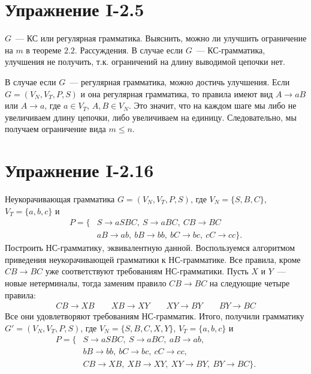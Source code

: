 \documentclass[12pt, oneside]{memoir}
\begin{document}
\section*{Упражнение I-2.5}
\begin{solution}
    {$G$~--- КС или регулярная грамматика.}
    {Выяснить, можно ли улучшить ограничение на $m$ в теореме $2.2$.}
    {Рассуждения.}
    В случае если $G$~--- КС-грамматика, улучшения не получить, т.к. ограничений на длину выводимой цепочки нет.

    В случае если $G$~--- регулярная грамматика, можно достичь улучшения.
    Если $G = (V_N, V_T, P, S)$ и она регулярная грамматика, то правила имеют вид $A \to aB$ или $A \to a$, где $a \in V_T$, $A,B \in V_N$.
    Это значит, что на каждом шаге мы либо не увеличиваем длину цепочки, либо увеличиваем на единицу.
    Следовательно, мы получаем ограничение вида $m \le n$.
\end{solution}

\section*{Упражнение I-2.16}
\begin{solution}
    {Неукорачивающая грамматика $G = (V_N, V_T, P, S)$, где $V_N = \{S, B, C\}$, $V_T = \{a,b,c\}$ и
        \begin{align*}
            P = \{ & S \to aSBC,\ S \to aBC,\ CB \to BC               \\
                   & aB \to ab,\ bB \to bb,\ bC \to bc,\ cC \to cc\}.
        \end{align*}}
    {Построить НС-грамматику, эквивалентную данной.}
    {Воспользуемся алгоритмом приведения неукорачивающей грамматики к НС-грамматике.}
    Все правила, кроме $CB \to BC$ уже соответствуют требованиям НС-грамматики.
    Пусть $X$ и $Y$~--- новые нетерминалы, тогда заменим правило $CB \to BC$ на следующие четыре правила:
    \begin{gather*}
        CB \to XB \qquad XB \to XY \qquad XY \to BY \qquad BY \to BC
    \end{gather*}
    Все они удовлетворяют требованиям НС-грамматик.
    Итого, получили грамматику $G' = (V_N, V_T, P, S)$, где $V_N = \{S, B, C, X, Y\}$, $V_T = \{a,b,c\}$ и
    \begin{align*}
        P = \{ & S \to aSBC,\ S \to aBC,\ aB \to ab,                \\
               & bB \to bb,\ bC \to bc,\ cC \to cc,                 \\
               & CB \to XB,\ XB \to XY, \ XY \to BY, \ BY \to BC\}.
    \end{align*}
\end{solution}
\end{document}
